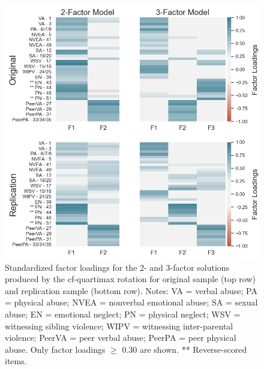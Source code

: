 \documentclass[letterpaper,man,natbib,noextraspace,floatsintext,longtable,12pt]{apa6}
\begin{document}
\begin{figure}[H]
    \centering
    \includegraphics[width=1\textwidth,center]{figures/figS04.png}
    \caption{\normalfont Standardized factor loadings for the 2- and 3-factor solutions produced by the cf-quartimax rotation for original sample (top row) and replication sample (bottom row). \break \small Notes: VA = verbal abuse; PA = physical abuse; NVEA = nonverbal emotional abuse; SA = sexual abuse; EN = emotional neglect; PN = physical neglect; WSV = witnessing sibling violence; WIPV = witnessing inter-parental violence; PeerVA = peer verbal abuse; PeerPA = peer physical abuse. Only factor loadings $\geq$ 0.30 are shown. ** Reverse-scored items.}
    \label{fig:efa_cf}
\end{figure}
\end{document}
